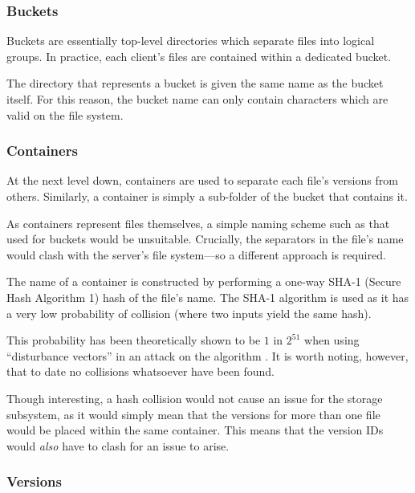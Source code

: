 \subsubsection{Buckets}
\label{sec:implementation-server-storage-buckets}

Buckets are essentially top-level directories which separate files into logical
groups. In practice, each client's files are contained within a dedicated
bucket.

The directory that represents a bucket is given the same name as the bucket
itself. For this reason, the bucket name can only contain characters which are
valid on the file system.

\subsubsection{Containers}
\label{sec:implementation-server-storage-containers}

At the next level down, containers are used to separate each file's versions
from others. Similarly, a container is simply a sub-folder of the bucket that
contains it.

As containers represent files themselves, a simple naming scheme such as that
used for buckets would be unsuitable. Crucially, the separators in the file's
name would clash with the server's file system---so a different approach is
required.

The name of a container is constructed by performing a one-way SHA-1 (Secure
Hash Algorithm 1) \cite{rfc3174} hash of the file's name. The SHA-1 algorithm
is used as it has a very low probability of collision (where two inputs yield
the same hash).

This probability has been theoretically shown to be $1$ in $2^{51}$ when using
``disturbance vectors'' in an attack on the algorithm \cite{manuelSHA}. It is
worth noting, however, that to date no collisions whatsoever have been found.

Though interesting, a hash collision would not cause an issue for the storage
subsystem, as it would simply mean that the versions for more than one file
would be placed within the same container. This means that the version IDs
would \emph{also} have to clash for an issue to arise.

\subsubsection{Versions}
\label{sec:implementation-server-storage-versions}

